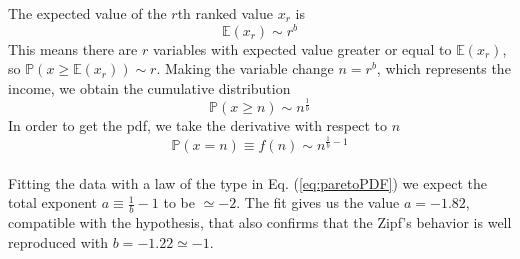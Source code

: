 The expected value of the $r$th ranked value $x_r$ is
\begin{equation*}
    \mathbb{E}(x_r)\sim r^b
\end{equation*}
This means there are $r$ variables with expected value greater or equal to $\mathbb{E}(x_r)$, so $\mathbb{P}(x \geq \mathbb{E}(x_r)) \sim r$.
Making the variable change $n=r^b$, which represents the income, we obtain the cumulative distribution
\begin{equation*}
    \mathbb{P}(x \geq n) \sim n^{\frac{1}{b}}
\end{equation*}
In order to get the pdf, we take the derivative with respect to $n$
\begin{equation}
    \mathbb{P}(x = n) \equiv f(n) \sim n^{\frac{1}{b} - 1}
    \label{eq:paretoPDF}
\end{equation}
\\Fitting the data with a law of the type in Eq. (\ref{eq:paretoPDF}) we expect the total exponent $a \equiv \frac{1}{b} - 1$ to be $\simeq -2$.
The fit gives us the value $a = -1.82$, compatible with the hypothesis, that also confirms that the Zipf's behavior is well reproduced with $b = -1.22 \simeq -1$.
